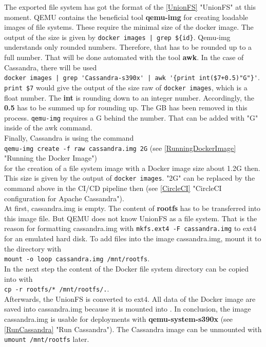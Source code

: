 The exported file system has got the format of the \ref{UnionFS} "UnionFS" at this moment. \gls{QEMU} contains the beneficial tool \textbf{qemu-img} for creating loadable images of file systems. These require the minimal size of the docker image. The output of the size is given by \lstinline!docker images | grep ${id}!. Qemu-img understands only rounded numbers. Therefore, that has to be rounded up to a full number. That will be done automated with the tool \textbf{awk}. 
In the case of Cassandra, there will be used \\
\lstinline!docker images | grep 'Cassandra-s390x' | awk '{print int($7+0.5)"G"}'!. \\
\lstinline!print $7! would give the output of the size raw of \lstinline!docker images!, which is a float number. The \textbf{int} is rounding down to an integer number. Accordingly, the \textbf{0.5} has to be summed up for rounding up. The GB has been removed in this process. \lstinline!qemu-img! requires a G behind the number. That can be added with "G" inside of the awk command. \\

Finally, Cassandra is using the command \\
\lstinline!qemu-img create -f raw cassandra.img 2G! (see \ref{RunningDockerImage} "Running the Docker Image") \\
for the creation of a file system image with a Docker image size about 1.2G then. This size is given by the output of \lstinline!docker images!.  "2G" can be replaced by the command above in the \gls{CI/CD} pipeline then (see \ref{CircleCI} "CircleCI configuration for Apache Cassandra"). \\
At first, cassandra.img is empty. The content of \textbf{rootfs} has to be transferred into this image file. But \gls{QEMU} does not know UnionFS as a file system. That is the reason for formatting cassandra.img with \lstinline!mkfs.ext4 -F cassandra.img! to ext4 for an emulated hard disk. To add files into the image cassandra.img, mount it to the directory  with \\
\lstinline!mount -o loop cassandra.img /mnt/rootfs!. \\ 
In the next step the content of the Docker file system directory can be copied into  with \\ 
\lstinline!cp -r rootfs/* /mnt/rootfs/.!. \\ 
Afterwards, the UnionFS is converted to ext4. All data of the Docker image are saved into cassandra.img because it is mounted into . In conclusion, the image cassandra.img is usable for deployments with \textbf{qemu-system-s390x} (see \ref{RunCassandra} "Run Cassandra"). 
The Cassandra image can be unmounted with \lstinline!umount /mnt/rootfs! later.
